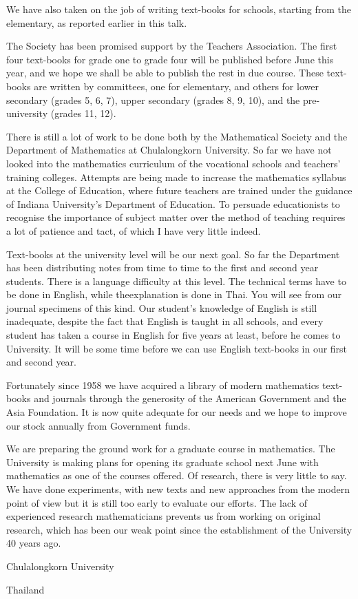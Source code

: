 We have also taken on the job of writing text-books for schools, starting from the elementary, as reported earlier in this talk.

The Society has been promised support by the Teachers Association. The first four text-books for grade one to grade four will be published before June this year, and we hope we shall be able to publish the rest in due course. These text-books are written by committees, one for elementary, and others for lower secondary (grades 5, 6, 7), upper secondary (grades 8, 9, 10), and the pre-university (grades 11, 12).

There is still a lot of work to be done both by the Mathematical Society and the Department of Mathematics at Chulalongkorn University. So far we have not looked into the mathematics curriculum of the vocational schools and teachers' training colleges. Attempts are being made to increase the mathematics syllabus at the College of Education, where future teachers are trained under the guidance of Indiana University's Department of Education. To persuade educationists to recognise the importance of subject matter over the method of teaching requires a lot of patience and tact, of which I have very little indeed.

Text-books at the university level will be our next goal. So far the Department has been distributing notes from time to time to the first and second year students. There is a language difficulty at this level. The technical terms have to be done in English, while the\pageoriginale explanation is done in Thai. You will see from our journal specimens of this kind. Our student's knowledge of English is still inadequate, despite the fact that English is taught in all schools, and every student has taken a course in English for five years at least, before he comes to University. It will be some time before we can use English text-books in our first and second year.

Fortunately since 1958 we have acquired a library of modern mathematics text-books and journals through the generosity of the American Government and the Asia Foundation. It is now quite adequate for our needs and we hope to improve our stock annually from Government funds.

We are preparing the ground work for a graduate course in mathematics. The University is making plans for opening its graduate school next June with mathematics as one of the courses offered. Of research, there is very little to say. We have done experiments, with new texts and new approaches from the modern point of view but it is still too early to evaluate our efforts. The lack of experienced research mathematicians prevents us from working on original research, which has been our weak point since the establishment of the University 40 years ago.

\bigskip
\medskip
{\fontsize{9pt}{11pt}\selectfont
Chulalongkorn University

Thailand}\relax

